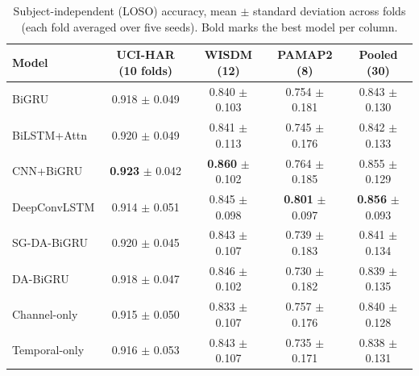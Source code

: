 \documentclass[11pt,a4paper]{article}
\begin{document}
\begin{table}[h]
\centering
\caption{Subject-independent (LOSO) accuracy, mean $\pm$ standard deviation across folds (each fold averaged over five seeds). Bold marks the best model per column.}
\label{tab:acc}
\small
\begin{tabular}{lcccc}
\toprule
Model & UCI-HAR (10 folds) & WISDM (12) & PAMAP2 (8) & Pooled (30) \\
\midrule
BiGRU & 0.918 $\pm$ 0.049 & 0.840 $\pm$ 0.103 & 0.754 $\pm$ 0.181 & 0.843 $\pm$ 0.130 \\
BiLSTM+Attn & 0.920 $\pm$ 0.049 & 0.841 $\pm$ 0.113 & 0.745 $\pm$ 0.176 & 0.842 $\pm$ 0.133 \\
CNN+BiGRU & \textbf{0.923} $\pm$ 0.042 & \textbf{0.860} $\pm$ 0.102 & 0.764 $\pm$ 0.185 & 0.855 $\pm$ 0.129 \\
DeepConvLSTM & 0.914 $\pm$ 0.051 & 0.845 $\pm$ 0.098 & \textbf{0.801} $\pm$ 0.097 & \textbf{0.856} $\pm$ 0.093 \\
\midrule
SG-DA-BiGRU & 0.920 $\pm$ 0.045 & 0.843 $\pm$ 0.107 & 0.739 $\pm$ 0.183 & 0.841 $\pm$ 0.134 \\
DA-BiGRU & 0.918 $\pm$ 0.047 & 0.846 $\pm$ 0.102 & 0.730 $\pm$ 0.182 & 0.839 $\pm$ 0.135 \\
Channel-only & 0.915 $\pm$ 0.050 & 0.833 $\pm$ 0.107 & 0.757 $\pm$ 0.176 & 0.840 $\pm$ 0.128 \\
Temporal-only & 0.916 $\pm$ 0.053 & 0.843 $\pm$ 0.107 & 0.735 $\pm$ 0.171 & 0.838 $\pm$ 0.131 \\
\bottomrule
\end{tabular}
\end{table}
\end{document}

